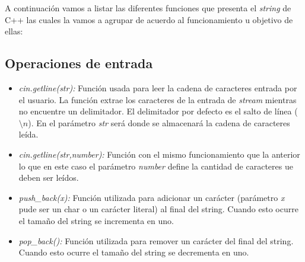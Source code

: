 A continuación vamos a listar las diferentes funciones que presenta el \emph{string} de C++ las cuales la vamos a agrupar de acuerdo al funcionamiento u objetivo de ellas: 

\subsection{Operaciones de entrada}
\begin{itemize}
	\item \emph{cin.getline(str):} Función usada para leer la cadena de caracteres entrada por el usuario. La función extrae los caracteres de la entrada de \emph{stream} mientras no encuentre un delimitador. El delimitador por defecto es el salto de línea ($\setminus n$). En el parámetro \emph{str} será donde se almacenará la cadena de caracteres leída.
	\item \emph{cin.getline(str,number):} Función con el mismo funcionamiento que la anterior lo que en este caso el parámetro \emph{number} define la cantidad de caracteres ue deben ser leídos. 
	\item \emph{push\_back(x):} Función utilizada para adicionar un carácter (parámetro \emph{x} pude ser un char o un carácter literal) al final del string. Cuando esto ocurre el tamaño del string se incrementa en uno.  
	\item \emph{pop\_back():} Función utilizada para remover un carácter del final del string. Cuando esto ocurre el tamaño del string se decrementa en uno.
\end{itemize}
